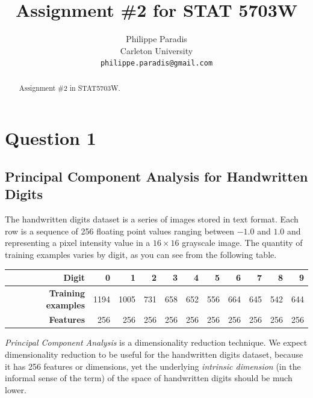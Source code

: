 \documentclass[12pt,article,oneside]{memoir}
\begin{document}
%
%

\pagestyle{headings}  %
\title{Assignment \#2 for STAT 5703W}
%
%
\author{Philippe Paradis\\\medskip Carleton University\\ \texttt{philippe.paradis@gmail.com}}
%
%

\setcounter{tocdepth}{4}
\setcounter{secnumdepth}{4}
\maketitle              %

\begin{abstract}
Assignment \#2 in STAT5703W.
\end{abstract}
%

\tableofcontents

\section{Question 1}

\subsection{Principal Component Analysis for Handwritten Digits}
The handwritten digits dataset is a series of images stored in text format. Each row is a sequence of 256 floating point values ranging between $-1.0$ and $1.0$ and representing a pixel intensity value in a $16 \times 16$ grayscale image. The quantity of training examples varies by digit, as you can see from the following table.
\begin{table}[H]
	\centering
	\begin{tabular}{rrrrrrrrrrr}
		\hline
		\textbf{Digit} & 0 & 1 & 2 & 3 & 4 & 5 & 6 & 7 & 8 & 9 \\ 
		\hline
		\textbf{Training examples} & 1194 & 1005 & 731 & 658 & 652 & 556 & 664 & 645 & 542 & 644 \\ 
		\textbf{Features} & 256 & 256 & 256 & 256 & 256 & 256 & 256 & 256 & 256 & 256 \\ 
		\hline
	\end{tabular}
	\label{table:dataset}
\end{table}
\emph{Principal Component Analysis} is a dimensionality reduction technique. We expect dimensionality reduction to be useful for the handwritten digits dataset, because it has 256 features or dimensions, yet the underlying \emph{intrinsic dimension} (in the informal sense of the term) of the space of handwritten digits should be much lower. 
\end{document}
